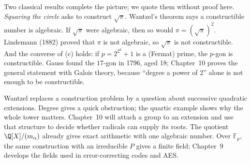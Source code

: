 \begin{remark}
Two classical results complete the picture; we quote them without proof here. \emph{Squaring the circle} asks to construct $\sqrt\pi$. Wantzel's theorem says a constructible number is algebraic. If $\sqrt\pi$ were algebraic, then so would $\pi=(\sqrt\pi)^2$. Lindemann (1882) proved that $\pi$ is not algebraic, so $\sqrt\pi$ is not constructible. And the converse of (c) holds: if $p=2^{2^k}+1$ is a (Fermat) prime, the $p$-gon is constructible. Gauss found the $17$-gon in 1796, aged 18; Chapter~10 proves the general statement with Galois theory, because ``degree a power of $2$'' alone is not enough to be constructible.
\end{remark}

\begin{beauty}
Wantzel replaces a construction problem by a question about successive
quadratic extensions. Degree gives a quick obstruction; the quartic
example shows why the whole tower matters. Chapter~10 will attach a
group to an extension and use that structure to decide whether radicals
can supply its roots. The quotient $\Q[X]/(m_\alpha)$ already gives
exact arithmetic with one algebraic number. Over $\mathbb F_p$, the
same construction with an irreducible $P$ gives a finite field;
Chapter~9 develops the fields used in error-correcting codes and AES.
\end{beauty}

